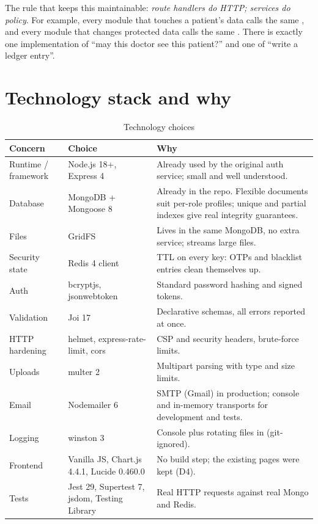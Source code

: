The rule that keeps this maintainable: \emph{route handlers do HTTP; services
do policy}. For example, every module that touches a patient's data calls the
same , and every module that changes
protected data calls the same . There is exactly
one implementation of ``may this doctor see this patient?'' and one of ``write a
ledger entry''.

\section{Technology stack and why}

\begin{table}[H]
\centering\small
\caption{Technology choices}\label{tab:stack}
\begin{tabularx}{\textwidth}{@{}P{3cm}P{3.4cm}Y@{}}
\toprule
\textbf{Concern} & \textbf{Choice} & \textbf{Why} \\
\midrule
Runtime / framework & Node.js 18+, Express 4 & Already used by the original auth service; small and well understood. \\
Database & MongoDB + Mongoose 8 & Already in the repo. Flexible documents suit per-role profiles; unique and partial indexes give real integrity guarantees. \\
Files & GridFS & Lives in the same MongoDB, no extra service; streams large files. \\
Security state & Redis 4 client & TTL on every key: OTPs and blacklist entries clean themselves up. \\
Auth & bcryptjs, jsonwebtoken & Standard password hashing and signed tokens. \\
Validation & Joi 17 & Declarative schemas, all errors reported at once. \\
HTTP hardening & helmet, express-rate-limit, cors & CSP and security headers, brute-force limits. \\
Uploads & multer 2 & Multipart parsing with type and size limits. \\
Email & Nodemailer 6 & SMTP (Gmail) in production; console and in-memory transports for development and tests. \\
Logging & winston 3 & Console plus rotating files in  (git-ignored). \\
Frontend & Vanilla JS, Chart.js 4.4.1, Lucide 0.460.0 & No build step; the existing pages were kept (D4). \\
Tests & Jest 29, Supertest 7, jsdom, Testing Library & Real HTTP requests against real Mongo and Redis. \\
\bottomrule
\end{tabularx}
\end{table}


